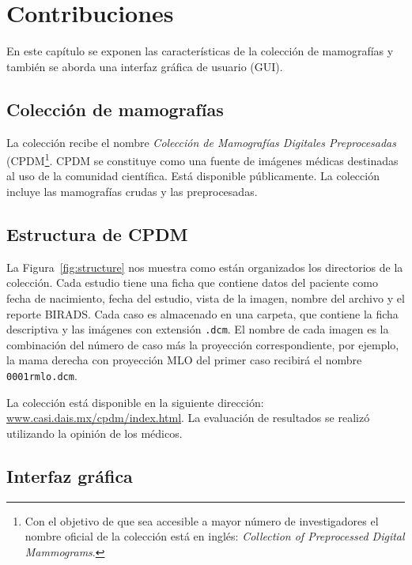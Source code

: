 \chapter{Contribuciones}
\label{resultados}

En este capítulo se exponen las características de la colección de mamografías y
también se aborda una interfaz gráfica de usuario (GUI).

\section{Colección de mamografías}

La colección recibe el nombre \textit{Colección de Mamografías Digitales
Preprocesadas} (CPDM\footnote{Con el objetivo de que sea accesible a mayor
número de investigadores el nombre oficial de la colección está en inglés:
\textit{Collection of Preprocessed Digital Mammograms}.}. CPDM se constituye
como una fuente de imágenes médicas destinadas al uso de la comunidad
científica. Está disponible públicamente. La colección incluye las mamografías
crudas y las preprocesadas.

\section{Estructura de CPDM}

La Figura~\ref{fig:structure} nos muestra como están organizados los
directorios de la colección. Cada estudio tiene una ficha que contiene datos
del paciente como fecha de nacimiento, fecha del estudio, vista de la imagen,
nombre del archivo y el reporte BIRADS. Cada caso es almacenado en una carpeta,
que contiene la ficha descriptiva y las imágenes con extensión \texttt{.dcm}.
El nombre de cada imagen es la combinación del número de caso más la proyección
correspondiente, por ejemplo, la mama derecha con proyección MLO del primer
caso recibirá el nombre \texttt{0001rmlo.dcm}.

La colección está disponible en la siguiente dirección:
\url{www.casi.dais.mx/cpdm/index.html}. La evaluación de resultados se realizó
utilizando la opinión de los médicos.

\shorthandoff{>} %
    
\shorthandon{>}

\section{Interfaz gráfica}

